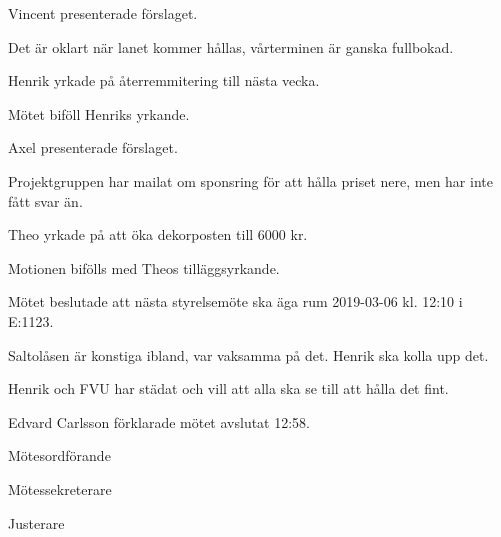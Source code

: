 \documentclass[10pt]{article}
\def\mo{Edvard Carlsson}
\def\ms{Johannes Larsson}
\def\ji{Jakob Pettersson}
\begin{document}
\begin{paragrafer}
\begin{paragrafer}
	\end{paragrafer}

	Vincent presenterade förslaget.

	Det är oklart när lanet kommer hållas, vårterminen är ganska fullbokad. 
  
	Henrik yrkade på återremmitering till nästa vecka.

	Mötet biföll Henriks yrkande.



	











Axel presenterade förslaget. 

Projektgruppen har mailat om sponsring för att hålla priset nere, men har inte fått svar än.

Theo yrkade på att öka dekorposten till 6000 kr.

Motionen bifölls med Theos tilläggsyrkande.

Mötet beslutade att nästa styrelsemöte ska äga rum 2019-03-06 kl. 12:10 i E:1123.


	\Ibfu
Saltolåsen är konstiga ibland, var vaksamma på det. Henrik ska kolla upp det.

Henrik och FVU har städat och vill att alla ska se till att hålla det fint.



	{\mo} förklarade mötet avslutat 12:58.
\end{paragrafer}

\vspace*{\fill}
\hidesignfoot
\begin{signatures}{3}
	\signature{\mo}{Mötesordförande}
	\signature{\ms}{Mötessekreterare}
	\signature{\ji}{Justerare}
\end{signatures}
\end{document}
